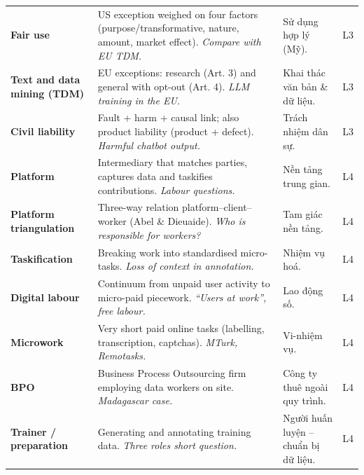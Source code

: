 \documentclass[11pt,a4paper]{article}
\begin{document}
{\begin{longtable}{>{\RaggedRight\arraybackslash\bfseries}p{3.3cm}>{\RaggedRight\arraybackslash}p{5.1cm}>{\RaggedRight\arraybackslash}p{5.1cm}>{\centering\arraybackslash}p{0.8cm}}
Fair use & US exception weighed on four factors (purpose/transformative, nature, amount, market effect). \newline\textit{\color{teal}Compare with EU TDM.} & \textcolor{tipc}{Sử dụng hợp lý (Mỹ).} & L3\\[3pt]
Text and data mining (TDM) & EU exceptions: research (Art. 3) and general with opt-out (Art. 4). \newline\textit{\color{teal}LLM training in the EU.} & \textcolor{tipc}{Khai thác văn bản \& dữ liệu.} & L3\\[3pt]
Civil liability & Fault + harm + causal link; also product liability (product + defect). \newline\textit{\color{teal}Harmful chatbot output.} & \textcolor{tipc}{Trách nhiệm dân sự.} & L3\\[3pt]
Platform & Intermediary that matches parties, captures data and taskifies contributions. \newline\textit{\color{teal}Labour questions.} & \textcolor{tipc}{Nền tảng trung gian.} & L4\\[3pt]
Platform triangulation & Three-way relation platform–client–worker (Abel \& Dieuaide). \newline\textit{\color{teal}Who is responsible for workers?} & \textcolor{tipc}{Tam giác nền tảng.} & L4\\[3pt]
Taskification & Breaking work into standardised micro-tasks. \newline\textit{\color{teal}Loss of context in annotation.} & \textcolor{tipc}{Nhiệm vụ hoá.} & L4\\[3pt]
Digital labour & Continuum from unpaid user activity to micro-paid piecework. \newline\textit{\color{teal}“Users at work”, free labour.} & \textcolor{tipc}{Lao động số.} & L4\\[3pt]
Microwork & Very short paid online tasks (labelling, transcription, captchas). \newline\textit{\color{teal}MTurk, Remotasks.} & \textcolor{tipc}{Vi-nhiệm vụ.} & L4\\[3pt]
BPO & Business Process Outsourcing firm employing data workers on site. \newline\textit{\color{teal}Madagascar case.} & \textcolor{tipc}{Công ty thuê ngoài quy trình.} & L4\\[3pt]
Trainer / preparation & Generating and annotating training data. \newline\textit{\color{teal}Three roles short question.} & \textcolor{tipc}{Người huấn luyện – chuẩn bị dữ liệu.} & L4\\[3pt]

\end{longtable}}
\end{document}
